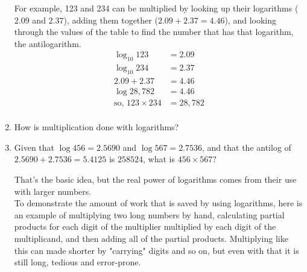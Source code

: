 \documentclass[12pt]{article}
\begin{document}
\begin{enumerate}
For example, 123 and 234 can be multiplied by looking up their logarithms ($2.09$ and $2.37$), adding them together ($2.09+2.37=4.46$), and looking through the values of the table to find the number that has that logarithm, the antilogarithm.\\
\begin{align*}
\log_{10}123&=2.09\\
\log_{10}234&=2.37\\
2.09+2.37&=4.46\\
\log {28,782}&=4.46\\
\text{so, }123 \times 234&=28,782\\
\end{align*}

\item How is multiplication done with logarithms?
\item Given that $\log456=2.5690$ and $\log567=2.7536$, and that the antilog of $2.5690+2.7536=5.4125$ is $258524$, what is $456\times567$?

\vspace{12pt}
That's the basic idea, but the real power of logarithms comes from their use with larger numbers.\\

To demonstrate the amount of work that is saved by using logarithms, here is an example of multiplying two long numbers by hand, calculating partial products for each digit of the multiplier multiplied by each digit of the multiplicand, and then adding all of the partial products. Multiplying like this can made shorter by "carrying" digits and so on, but even with that it is still long, tedious and error-prone.


\end{enumerate}
\end{document}
